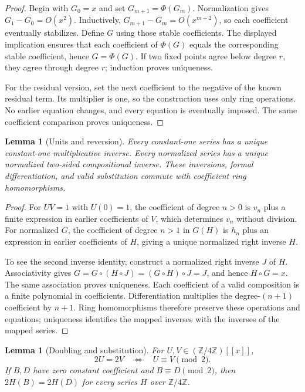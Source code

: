 \documentclass[11pt,a4paper]{article}
\newtheorem{lemma}[theorem]{Lemma}
\theoremstyle{remark}
\newcommand{\Z}{\mathbb Z}
\begin{document}
\begin{proof}
Begin with $G_0=x$ and set $G_{m+1}=\Phi(G_m)$. Normalization gives
$G_1-G_0=O(x^2)$. Inductively,
$G_{m+1}-G_m=O(x^{m+2})$, so each coefficient eventually stabilizes.
Define $G$ using those stable coefficients. The displayed implication
ensures that each coefficient of $\Phi(G)$ equals the corresponding stable
coefficient, hence $G=\Phi(G)$. If two fixed points agree below degree
$r$, they agree through degree $r$; induction proves uniqueness.

For the residual version, set the next coefficient to the negative of the
known residual term. Its multiplier is one, so the construction uses only
ring operations. No earlier equation changes, and every equation is
eventually imposed. The same coefficient comparison proves uniqueness.
\end{proof}

\begin{lemma}[Units and reversion]\label{lem:inverse}
Every constant-one series has a unique constant-one multiplicative
inverse. Every normalized series has a unique normalized two-sided
compositional inverse. These inversions, formal differentiation, and
valid substitution commute with coefficient ring homomorphisms.
\end{lemma}

\begin{proof}
For $UV=1$ with $U(0)=1$, the coefficient of degree $n>0$ is $v_n$ plus
a finite expression in earlier coefficients of $V$, which determines
$v_n$ without division. For normalized $G$, the coefficient of degree
$n>1$ in $G(H)$ is $h_n$ plus an expression in earlier coefficients of
$H$, giving a unique normalized right inverse $H$.

To see the second inverse identity, construct a normalized right inverse
$J$ of $H$. Associativity gives
$G=G\circ(H\circ J)=(G\circ H)\circ J=J$, and hence $H\circ G=x$.
The same association proves uniqueness. Each coefficient of a valid
composition is a finite polynomial in coefficients. Differentiation
multiplies the degree-$(n+1)$ coefficient by $n+1$. Ring homomorphisms
therefore preserve these operations and equations; uniqueness identifies
the mapped inverses with the inverses of the mapped series.
\end{proof}

\begin{lemma}[Doubling and substitution]\label{lem:double}
For $U,V\in(\Z/4\Z)[[x]]$,
\[
 2U=2V\quad\Longleftrightarrow\quad
 U\equiv V\pmod2.
\]
If $B,D$ have zero constant coefficient and $B\equiv D\pmod2$, then
$2H(B)=2H(D)$ for every series $H$ over $\Z/4\Z$.
\end{lemma}
\end{document}
